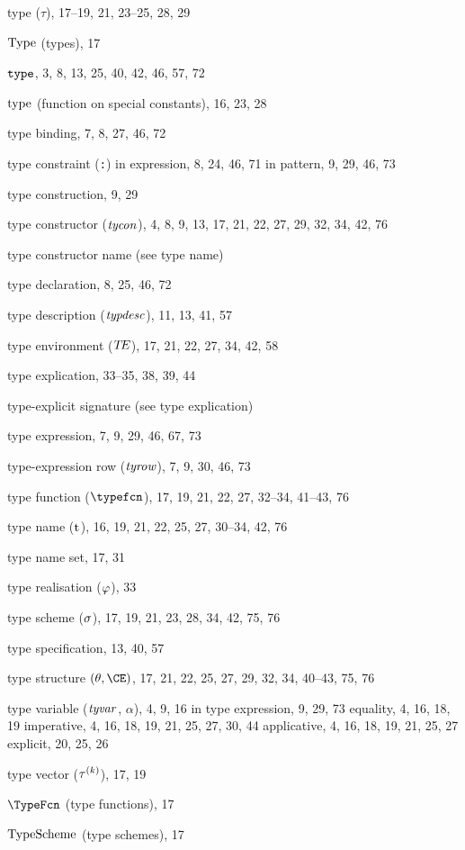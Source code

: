 \begin{theindex}
\item type ($\tau$), 17--19, 21, 23--25, 28, 29
\item ${\rm Type}$ (types), 17
\item ${\tt type}$, 3, 8, 13, 25, 40, 42, 46, 57, 72
\item $\mathop{\rm type}\nolimits$ (function on special constants), 16, 23, 28
\item type binding, 7, 8, 27, 46, 72
\item type constraint (\verb+:+) 
\subitem in expression, 8, 24, 46, 71
\subitem in pattern, 9, 29, 46, 73
\item type construction, 9, 29
\item type constructor (${\it tycon}$), 4, 8, 9, 13, 17, 21, 22, 27, 29, 32, 34, 42, 76
\item type constructor name (see type name) 
\item type declaration, 8, 25, 46, 72
\item type description (${\it typdesc}$), 11, 13, 41, 57
\item type environment ($\mbox{$T\!E$}$), 17, 21, 22, 27, 34, 42, 58
\item type explication, 33--35, 38, 39, 44
\item type-explicit signature (see type explication) 
\item type expression, 7, 9, 29, 46, 67, 73
\item type-expression row (${\it tyrow}$), 7, 9, 30, 46, 73
\item type function ($\typefcn$), 17, 19, 21, 22, 27, 32--34, 41--43, 76
\item type name (${\rm t}^{{}}$), 16, 19, 21, 22, 25, 27, 30--34, 42, 76
\item type name set, 17, 31
\item type realisation ($\varphi$), 33
\item type scheme ($\sigma$), 17, 19, 21, 23, 28, 34, 42, 75, 76
\item type specification, 13, 40, 57
\item type structure $(\theta,\CE)$, 17, 21, 22, 25, 27, 29, 32, 34, 40--43, 75, 76
\item type variable (${\it tyvar}$, $\alpha$), 4, 9, 16
\subitem in type expression, 9, 29, 73
\subitem equality, 4, 16, 18, 19
\subitem imperative, 4, 16, 18, 19, 21, 25, 27, 30, 44
\subitem applicative, 4, 16, 18, 19, 21, 25, 27
\subitem explicit, 20, 25, 26
\item type vector ($\tau^{(k)}$), 17, 19
\item $\TypeFcn$ (type functions), 17
\item ${\rm TypeScheme}$ (type schemes), 17

\end{theindex}
